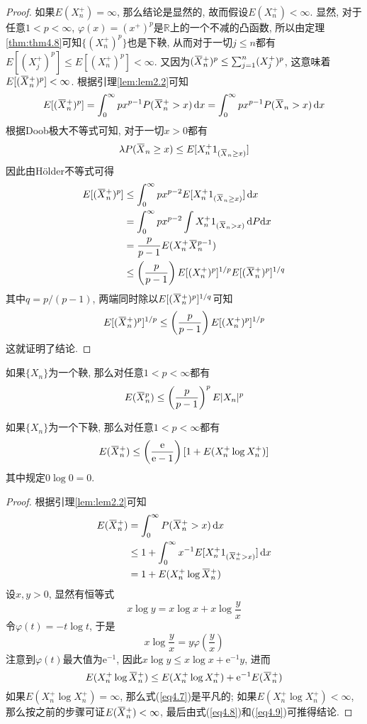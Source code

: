 \documentclass[cn, 12pt, math=mtpro2, bibstyle=apa, blue, twocol]{elegantbook}
\newcommand{\R}{\mathbb{R}}
\newcommand{\overbar}[1]{\mkern 1.5mu\overline{\mkern-1.5mu#1\mkern-1.5mu}\mkern 1.5mu}
\begin{document}
\begin{proof}
  如果$E(X_n^+)=\infty$, 那么结论是显然的, 故而假设$E(X_n^+)<\infty$. 显然, 对于任意$1<p<\infty$, $\varphi(x)=(x^+)^p$是$\R$上的一个不减的凸函数, 所以由定理\ref{thm:thm4.8}可知$\{(X_n^+)^p\}$也是下鞅, 从而对于一切$j\leq n$都有$E[(X_j^+)^p]\leq E[(X_n^+)^p]<\infty$. 又因为$(\overbar{X}_n^+)^p\leq \sum_{j=1}^{n}(X_j^+)^p$, 这意味着$E[(\overbar{X}_n^+)^p]<\infty$. 根据引理\ref{lem:lem2.2}可知
  $$E[(\overbar{X}_n^+)^p]=\int_{0}^{\infty}px^{p-1}P(\overbar{X}_n^+>x)\,\text{d}x=\int_{0}^{\infty}px^{p-1}P(\overbar{X}_n>x)\,\text{d}x$$
  根据Doob极大不等式可知, 对于一切$x>0$都有
  $$\lambda P(\overbar{X}_n\ge x)\leq E[X_n^+1_{(\overbar{X}_n\ge x)}]$$
  因此由Hölder不等式可得
  \begin{align*}
  E[(\overbar{X}_n^+)^p]&\leq\int_{0}^{\infty}px^{p-2}E[X_n^+1_{(\overbar{X}_n\ge x)}]\,\text{d}x \\
  &=\int_{0}^{\infty}px^{p-2}\int X_n^+1_{(\overbar{X}_n>x)}\,\text{d}P\text{d}x \\
  &=\frac{p}{p-1}E(X_n^+\overbar{X}_n^{p-1}) \\
  &\leq \left(\frac{p}{p-1}\right)E[(X_n^+)^p]^{1/p}E[(\overbar{X}_n^+)^{p}]^{1/q}
  \end{align*}
  其中$q=p/(p-1)$, 两端同时除以$E[(\overbar{X}_n^+)^{p}]^{1/q}$可知
  $$E[(\overbar{X}_n^+)^p]^{1/p}\leq\left(\frac{p}{p-1}\right)E[(X_n^+)^p]^{1/p}$$
  这就证明了结论.
\end{proof}
\begin{corollary}
如果$\{X_n\}$为一个鞅, 那么对任意$1<p<\infty$都有
$$E(\overbar{X}_n^p)\leq\left(\frac{p}{p-1}\right)^pE|X_n|^p$$
\end{corollary}
\begin{theorem}
  如果$\{X_n\}$为一个下鞅, 那么对任意$1<p<\infty$都有
  \begin{equation}\label{eq4.7}
    E(\overbar{X}_n^+)\leq\left(\frac{\text{e}}{\text{e}-1}\right)[1+E(X_n^+\log X_n^+)]
  \end{equation}
  其中规定$0\log0=0$.
\end{theorem}
\begin{proof}
  根据引理\ref{lem:lem2.2}可知
  \begin{align}
  E(\overbar{X}_n^+)&=\int_{0}^{\infty}P(\overbar{X}_n^+>x)\,\text{d}x \nonumber \\
  &\leq 1+\int_{0}^{\infty}x^{-1}E[X_n^+1_{(\overbar{X}_n^+>x)}]\,\text{d}x \nonumber \\
  &=1+E(X_n^+\log\overbar{X}_n^+) \label{eq4.8}
  \end{align}
  设$x,y>0$, 显然有恒等式
  $$x\log y=x\log x+x\log\frac{y}{x}$$
  令$\varphi(t)=-t\log t$, 于是
  $$x\log\frac{y}{x}=y\varphi\left(\frac{y}{x}\right)$$
  注意到$\varphi(t)$最大值为$\text{e}^{-1}$, 因此$x\log y\leq x\log x+\text{e}^{-1}y$, 进而
  \begin{equation}\label{eq4.9}
    E(X_n^+\log \overbar{X}_n^+)\leq E(X_n^+\log X_n^+)+\text{e}^{-1}E(\overbar{X}_n^+)
  \end{equation}
  如果$E(X_n^+\log X_n^+)=\infty$, 那么式(\ref{eq4.7})是平凡的; 如果$E(X_n^+\log X_n^+)<\infty$, 那么按之前的步骤可证$E(\overbar{X}_n^+)<\infty$, 最后由式(\ref{eq4.8})和(\ref{eq4.9})可推得结论.
\end{proof}
\end{document}
